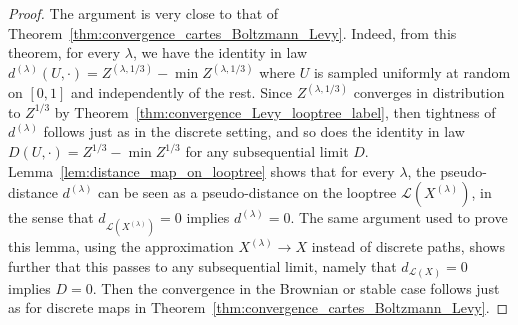 \documentclass[british, a4paper,11pt]{article}
\numberwithin{equation}{section}
\theoremstyle{definition}
\newcommand{\Loop}{\mathscr{L}}
\begin{document}
\begin{proof}
The argument is very close to that of Theorem~\ref{thm:convergence_cartes_Boltzmann_Levy}.
Indeed, from this theorem, for every $\lambda$, we have the identity in law $d^{(\lambda)}(U,\cdot) = Z^{(\lambda,1/3)} - \min Z^{(\lambda,1/3)}$ where $U$ is sampled uniformly at random on $[0,1]$ and independently of the rest. Since $Z^{(\lambda,1/3)}$ converges in distribution to $Z^{1/3}$ by Theorem~\ref{thm:convergence_Levy_looptree_label}, then tightness of $d^{(\lambda)}$ follows just as in the discrete setting, and so does the identity in law $D(U,\cdot) = Z^{1/3} - \min Z^{1/3}$ for any subsequential limit $D$.
Lemma~\ref{lem:distance_map_on_looptree} shows that for every $\lambda$, the pseudo-distance $d^{(\lambda)}$ can be seen as a pseudo-distance on the looptree $\Loop(X^{(\lambda)})$, in the sense that $d_{\Loop(X^{(\lambda)})}=0$ implies $d^{(\lambda)}=0$.
The same argument used to prove this lemma, using the approximation $X^{(\lambda)} \to X$ instead of discrete paths, shows further that this passes to any subsequential limit, namely that $d_{\Loop(X)}=0$ implies $D=0$.
Then the convergence in the Brownian or stable case follows just as for discrete maps in Theorem~\ref{thm:convergence_cartes_Boltzmann_Levy}.
\end{proof}


{}
\end{document}
